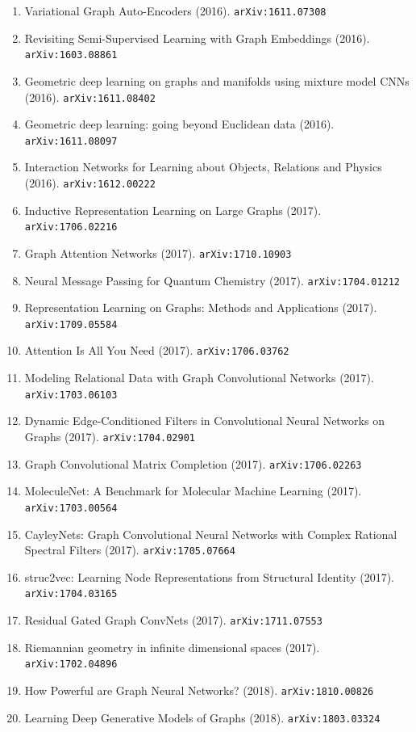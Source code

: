 \documentclass[11pt]{article}
\begin{document}
\begin{enumerate}
  \item Variational Graph Auto-Encoders (2016). \texttt{arXiv:1611.07308}
  \item Revisiting Semi-Supervised Learning with Graph Embeddings (2016). \texttt{arXiv:1603.08861}
  \item Geometric deep learning on graphs and manifolds using mixture model CNNs (2016). \texttt{arXiv:1611.08402}
  \item Geometric deep learning: going beyond Euclidean data (2016). \texttt{arXiv:1611.08097}
  \item Interaction Networks for Learning about Objects, Relations and Physics (2016). \texttt{arXiv:1612.00222}
  \item Inductive Representation Learning on Large Graphs (2017). \texttt{arXiv:1706.02216}
  \item Graph Attention Networks (2017). \texttt{arXiv:1710.10903}
  \item Neural Message Passing for Quantum Chemistry (2017). \texttt{arXiv:1704.01212}
  \item Representation Learning on Graphs: Methods and Applications (2017). \texttt{arXiv:1709.05584}
  \item Attention Is All You Need (2017). \texttt{arXiv:1706.03762}
  \item Modeling Relational Data with Graph Convolutional Networks (2017). \texttt{arXiv:1703.06103}
  \item Dynamic Edge-Conditioned Filters in Convolutional Neural Networks on
  Graphs (2017). \texttt{arXiv:1704.02901}
  \item Graph Convolutional Matrix Completion (2017). \texttt{arXiv:1706.02263}
  \item MoleculeNet: A Benchmark for Molecular Machine Learning (2017). \texttt{arXiv:1703.00564}
  \item CayleyNets: Graph Convolutional Neural Networks with Complex Rational
  Spectral Filters (2017). \texttt{arXiv:1705.07664}
  \item struc2vec: Learning Node Representations from Structural Identity (2017). \texttt{arXiv:1704.03165}
  \item Residual Gated Graph ConvNets (2017). \texttt{arXiv:1711.07553}
  \item Riemannian geometry in infinite dimensional spaces (2017). \texttt{arXiv:1702.04896}
  \item How Powerful are Graph Neural Networks? (2018). \texttt{arXiv:1810.00826}
  \item Learning Deep Generative Models of Graphs (2018). \texttt{arXiv:1803.03324}

\end{enumerate}
\end{document}
